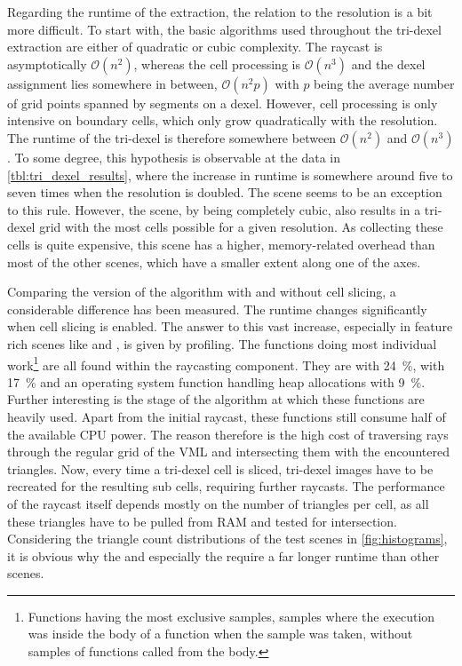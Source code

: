 Regarding the runtime of the extraction, the relation to the resolution is a bit more difficult.
To start with, the basic algorithms used throughout the tri-dexel extraction are either of quadratic or cubic complexity.
The raycast is asymptotically $\mathcal{O}(n^2)$, whereas the cell processing is $\mathcal{O}(n^3)$ and the dexel assignment lies somewhere in between, $\mathcal{O}(n^2p)$ with $p$ being the average number of grid points spanned by segments on a dexel.
However, cell processing is only intensive on boundary cells, which only grow quadratically with the resolution.
The runtime of the tri-dexel is therefore somewhere between $\mathcal{O}(n^2)$ and $\mathcal{O}(n^3)$.
To some degree, this hypothesis is observable at the data in \cref{tbl:tri_dexel_results}, where the increase in runtime is somewhere around five to seven times when the resolution is doubled.
The \cubes scene seems to be an exception to this rule.
However, the \cubes scene, by being completely cubic, also results in a tri-dexel grid with the most cells possible for a given resolution.
As collecting these cells is quite expensive, this scene has a higher, memory-related overhead than most of the other scenes, which have a smaller extent along one of the axes.

Comparing the version of the algorithm with and without cell slicing, a considerable difference has been measured.
The runtime changes significantly when cell slicing is enabled.
The answer to this vast increase, especially in feature rich scenes like \impeller and \turbine, is given by profiling.
The functions doing most individual work\footnote{
	Functions having the most exclusive samples, \ie samples where the execution was inside the body of a function when the sample was taken, without samples of functions called from the body.}
are all found within the raycasting component.
They are  with \SI{24}{\percent},  with \SI{17}{\percent} and an operating system function handling heap allocations with \SI{9}{\percent}.
Further interesting is the stage of the algorithm at which these functions are heavily used.
Apart from the initial raycast, these functions still consume half of the available CPU power.
The reason therefore is the high cost of traversing rays through the regular grid of the VML and intersecting them with the encountered triangles.
Now, every time a tri-dexel cell is sliced, tri-dexel images have to be recreated for the resulting sub cells, requiring further raycasts.
The performance of the raycast itself depends mostly on the number of triangles per cell, as all these triangles have to be pulled from RAM and tested for intersection.
Considering the triangle count distributions of the test scenes in \cref{fig:histograms}, it is obvious why the \impeller and especially the \turbine require a far longer runtime than other scenes. %


